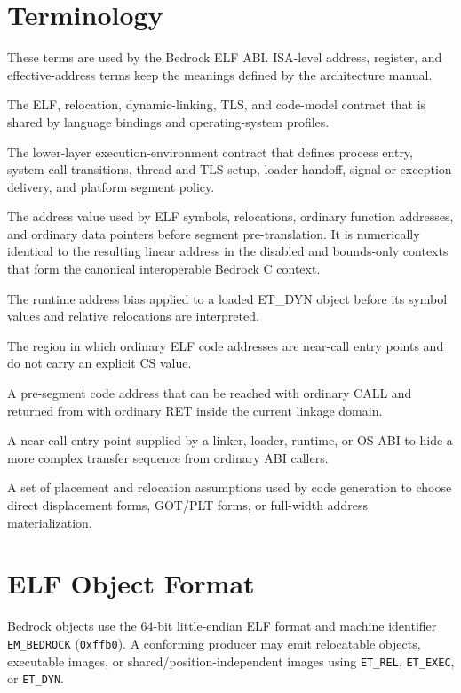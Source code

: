\documentclass[10pt,twoside]{article}
\begin{document}
\section{Terminology}\label{page:terminology}
These terms are used by the Bedrock ELF ABI. ISA-level address, register, and effective-address terms keep the meanings defined by the architecture manual.
\begin{description}[style=nextline,leftmargin=1.45in,labelwidth=1.35in,itemsep=3pt,topsep=3pt]
\item[ELF ABI] The ELF, relocation, dynamic-linking, TLS, and code-model contract that is shared by language bindings and operating-system profiles.
\item[platform/runtime environment ABI] The lower-layer execution-environment contract that defines process entry, system-call transitions, thread and TLS setup, loader handoff, signal or exception delivery, and platform segment policy.
\item[pre-segment virtual address] The address value used by ELF symbols, relocations, ordinary function addresses, and ordinary data pointers before segment pre-translation. It is numerically identical to the resulting linear address in the disabled and bounds-only contexts that form the canonical interoperable Bedrock C context.
\item[load base] The runtime address bias applied to a loaded ET\_DYN object before its symbol values and relative relocations are interpreted.
\item[ABI-visible linkage domain] The region in which ordinary ELF code addresses are near-call entry points and do not carry an explicit CS value.
\item[near-call entry address] A pre-segment code address that can be reached with ordinary CALL and returned from with ordinary RET inside the current linkage domain.
\item[veneer] A near-call entry point supplied by a linker, loader, runtime, or OS ABI to hide a more complex transfer sequence from ordinary ABI callers.
\item[code model] A set of placement and relocation assumptions used by code generation to choose direct displacement forms, GOT/PLT forms, or full-width address materialization.
\end{description}

\clearpage
\section{ELF Object Format}\label{page:elf-object-format}
Bedrock objects use the 64-bit little-endian ELF format and machine identifier
\texttt{EM\_\allowbreak{}BEDROCK} (\texttt{0xffb0}). A conforming producer may
emit relocatable objects, executable images, or shared/position-independent
images using \texttt{ET\_REL}, \texttt{ET\_EXEC}, or \texttt{ET\_DYN}.
\end{document}
